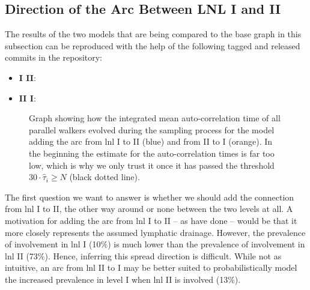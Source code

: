 \documentclass[\relativeRoot/main.tex]{subfiles}
\begin{document}
\subsection{Direction of the Arc Between LNL I and II}
\label{subsec:graph:extended:IandII}

\begin{tcolorbox}[title=\faIcon{recycle} Reproducibility, parbox=false]
    The results of the two models that are being compared to the base graph in this subsection can be reproduced with the help of the following tagged and released commits in the  repository:

    \begin{itemize}
        \item \textbf{I  II}: 
        \item \textbf{II  I}: 
    \end{itemize}
\end{tcolorbox}

\begin{figure}
    \centering
    
    \caption[
        Plot of mean integrated auto-correlation times during the sampling process
    ]{
        Graph showing how the integrated mean auto-correlation time of all parallel walkers evolved during the sampling process for the model adding the arc from \gls{lnl} I to II (blue) and from II to I (orange). In the beginning the estimate for the auto-correlation times is far too low, which is why we only trust it once it has passed the threshold $30 \cdot \hat{\tau}_i \geq N$ (black dotted line).
    }
    \label{fig:graph:extended:acor}
\end{figure}

The first question we want to answer is whether we should add the connection from \gls{lnl} I to II, the other way around or none between the two levels at all. A motivation for adding the arc from \gls{lnl} I to II -- as  have done -- would be that it more closely represents the assumed lymphatic drainage. However, the prevalence of involvement in \gls{lnl} I (10\%) is much lower than the prevalence of involvement in \gls{lnl} II (73\%). Hence, inferring this spread direction is difficult. While not as intuitive, an arc from \gls{lnl} II to I may be better suited to probabilistically model the increased prevalence in level I when \gls{lnl} II is involved (13\%).
\end{document}
